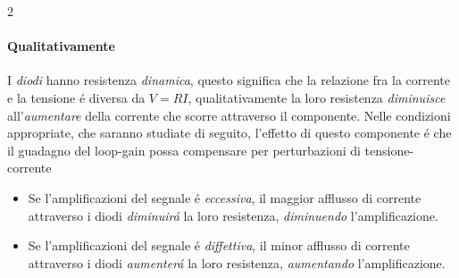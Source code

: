 \begin{multicols}{2}
  \paragraph{Qualitativamente}
  I \textit{diodi} hanno resistenza \textit{dinamica}, questo significa che la relazione fra la
  corrente e la tensione \'e diversa da $V = RI$, qualitativamente la loro resistenza \textit{diminuisce}
  all'\textit{aumentare} della corrente che scorre attraverso il componente. Nelle condizioni appropriate,
  che saranno studiate di seguito, l'effetto di questo componente \'e che il guadagno del loop-gain possa
  compensare per perturbazioni di tensione-corrente
  \begin{itemize}
  \item
    Se l'amplificazioni del segnale \'e \textit{eccessiva}, il maggior afflusso di corrente attraverso
    i diodi \textit{diminuir\'a} la loro resistenza, \textit{diminuendo} l'amplificazione.
  \item
    Se l'amplificazioni del segnale \'e \textit{diffettiva}, il minor afflusso di corrente attraverso
    i diodi \textit{aumenter\'a} la loro resistenza, \textit{aumentando} l'amplificazione.
  \end{itemize}

\end{multicols}
